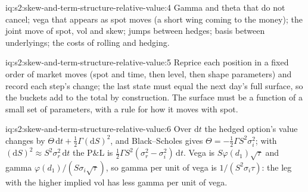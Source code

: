 \begin{solution}{iq:s2:skew-and-term-structure-relative-value:4}
Gamma and theta that do not cancel; vega that appears as spot moves (a short wing coming to the money); the joint move of spot, vol and skew; jumps
between hedges; basis between underlyings; the costs of rolling and hedging.
\end{solution}

\begin{solution}{iq:s2:skew-and-term-structure-relative-value:5}
Reprice each position in a fixed order of market moves (spot and time, then level, then shape parameters) and record each step's change; the last
state must equal the next day's full surface, so the buckets add to the total by construction. The surface must be a function of a small set of
parameters, with a rule for how it moves with spot.
\end{solution}

\begin{solution}{iq:s2:skew-and-term-structure-relative-value:6}
Over $\mathrm{d}t$ the hedged option's value changes by $\Theta\,\mathrm{d}t + \tfrac12\Gamma(\mathrm{d}S)^2$, and Black--Scholes gives $\Theta =
-\tfrac12\Gamma S^2\sigma_i^2$; with $(\mathrm{d}S)^2 \approx S^2\sigma_r^2\,\mathrm{d}t$ the P\&L is $\tfrac12\Gamma S^2(\sigma_r^2 -
\sigma_i^2)\,\mathrm{d}t$. Vega is $S\varphi(d_1)\sqrt\tau$ and gamma $\varphi(d_1)/(S\sigma_i\sqrt\tau)$, so gamma per unit of vega is
$1/(S^2\sigma_i\tau)$: the leg with the higher implied vol has less gamma per unit of vega.
\end{solution}
